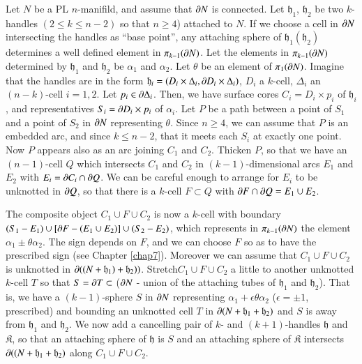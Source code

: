 Let $N$ be a PL $n$-manifild, and assume that $\partial N$ is connected. Let $\mathfrak{h}_{1}$, $\mathfrak{h}_{2}$ be two $k$-handles $(2\leq k\leq n-2)$ so that $n\geq 4$) attached to $N$. If we choose a cell in $\partial N$ intersecting the handles as ``base point'', any attaching sphere of $\mathfrak{h}_{1}(\mathfrak{h}_{2})$ determines a well defined element in $\pi_{k-1}(\partial N)$. Let the elements in $\pi_{k-1}(\partial N)$ determined by $\mathfrak{h}_{1}$ and $\mathfrak{h}_{2}$ be $\alpha_{1}$ and $\alpha_{2}$. Let $\theta$ be an element of $\pi_{1}(\partial N)$. Imagine that 
the handles are in the form $\mathfrak{h}_{i}=(D_{i}\times \Delta_{i},\partial D_{i}\times \Delta_{i})$, $D_{i}$ a $k$-cell, $\Delta_{i}$ an $(n-k)$-cell $i=1,2$. Let $p_{i}\in \partial \Delta_{i}$. Then, we have surface cores $C_{i}=D_{i}\times p_{i}$ of $\mathfrak{h}_{i}$, and representatives $S_{i}=\partial D_{i}\times p_{i}$ of $\alpha_{i}$. Let $P$ be a path between a point of $S_{1}$ and a point of $S_{2}$ in $\partial N$ representing $\theta$. Since $n\geq 4$, we can assume that $P$ is an embedded arc, and since $k\leq n-2$, that it meets each $S_{i}$ at exactly one point. Now $P$ appears also as an arc joining $C_{1}$ and $C_{2}$. Thicken $P$, so that we have an $(n-1)$-cell $Q$ which intersects $C_{1}$ and $C_{2}$ in $(k-1)$-dimensional arcs $E_{1}$ and $E_{2}$ with $E_{i}=\partial C_{i}\cap \partial Q$. We can be careful enough to arrange for $E_{i}$ to be unknotted in $\partial Q$, so that there is a $k$-cell $F\subset Q$ with $\partial F\cap\partial Q=E_{1}\cup E_{2}$.

The composite object $C_{1}\cup F\cup C_{2}$ is now a $k$-cell with boundary $(S_{1}-E_{1})\cup [\partial F-(E_{1}\cup E_{2})]\cup (S_{2}-E_{2})$, which represents in $\pi_{k-1}(\partial N)$ the element $\alpha_{1}\pm \theta \alpha_{2}$. The sign depends on $F$, and we can choose $F$ so as to have the prescribed sign (see Chapter \ref{chap7}). Moreover we can assume that $C_{1}\cup F\cup C_{2}$ is unknotted in $\partial((N+\mathfrak{h}_{1})+\mathfrak{h}_{2}))$. Stretch\pageoriginale $C_{1}\cup F\cup C_{2}$ a little to another unknotted $k$-cell $T$ so that $S=\partial T\subset$ ($\partial N$ - union of the attaching tubes of $\mathfrak{h}_{1}$ and $\mathfrak{h}_{2}$). That is, we have a $(k-1)$-sphere $S$ in $\partial N$ representing $\alpha_{1}+\epsilon \theta \alpha_{2}$ ($\epsilon=\pm 1$, prescribed) and bounding an unknotted cell $T$ in $\partial (N+\mathfrak{h}_{1}+\mathfrak{h}_{2})$ and $S$ is away from $\mathfrak{h}_{1}$ and $\mathfrak{h}_{2}$. We now add a cancelling pair of $k$- and $(k+1)$-handles $\mathfrak{h}$ and $\mathfrak{K}$, so that an attaching sphere of $\mathfrak{h}$ is $S$ and an attaching sphere of $\mathfrak{K}$ intersects $\partial((N+\mathfrak{h}_{1}+\mathfrak{h}_{2})$ along $C_{1}\cup F\cup C_{2}$.

